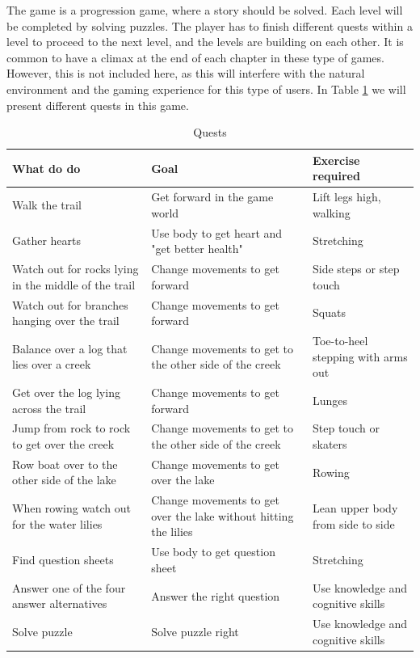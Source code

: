 The game is a progression game, where a story should be solved. Each level will be completed by solving puzzles. The player has to finish different quests within a level to proceed to the next level, and the levels are building on each other. It is common to have a climax at the end of each chapter in these type of games. However, this is not included here, as this will interfere with the natural environment and the gaming experience for this type of users. In Table \ref{tab:quests1} we will present different quests in this game. 
  
\begin{table}
\begin{tabular}{|>{\raggedright}p{}|>{\raggedright}p{4cm}|p{}|}
\hline
\textbf{What do do} & \textbf{Goal} & \textbf{Exercise required}  \\ \hline
Walk the trail & Get forward in the game world & Lift legs high, walking  \\ \hline
Gather hearts & Use body to get heart and "get better health" &  Stretching \\ \hline
Watch out for rocks lying in the middle of the trail & Change movements to get forward & Side steps or step touch  \\ \hline
Watch out for branches hanging over the trail & Change movements to get forward & Squats
\\ \hline
Balance over a log that lies over a creek & Change movements to get to the other side of the creek & Toe-to-heel stepping with arms out \\ \hline
Get over the log lying across the trail & Change movements to get forward & Lunges \\ \hline
Jump from rock to rock to get over the creek & Change movements to get to the other side of the creek & Step touch or skaters \\ \hline
Row boat over to the other side of the lake & Change movements to get over the lake  & Rowing \\ \hline
When rowing watch out for the water lilies & Change movements to get over the lake without hitting the lilies  & Lean upper body from side to side \\ \hline
Find question sheets & Use body to get question sheet  & Stretching \\ \hline
Answer one of the four answer alternatives & Answer the right question  & Use knowledge and cognitive skills \\ \hline
Solve puzzle & Solve puzzle right  & Use knowledge and cognitive skills \\ \hline
\end{tabular}
\caption[Quests in the "Nature trail" game]{Quests}
\label{tab:quests1}
\end{table}
 
